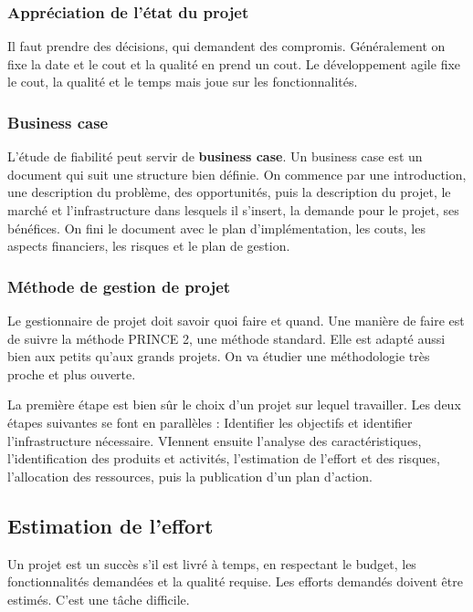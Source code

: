 \subsubsection{Appréciation de l'état du projet}
Il faut prendre des décisions, qui demandent des compromis. Généralement on fixe la date et le cout et la qualité en prend un cout. Le développement agile fixe le cout, la qualité et le temps mais joue sur les fonctionnalités.



\subsubsection{Business case}
L’étude de fiabilité peut servir de \textbf{business case}.
Un business case est un document qui suit une structure bien définie. On commence par une introduction, une description du problème, des opportunités, puis la description du projet, le marché et l’infrastructure dans lesquels il s’insert, la demande pour le projet, ses bénéfices.
On fini le document avec le plan d’implémentation, les couts, les aspects financiers, les risques et le plan de gestion.



\subsubsection{Méthode de gestion de projet}
Le gestionnaire de projet doit savoir quoi faire et quand.
Une manière de faire est de suivre la méthode PRINCE 2, une méthode standard. Elle est adapté aussi bien aux petits qu’aux grands projets.
On va étudier une méthodologie très proche et plus ouverte.

La première étape est bien sûr le choix d’un projet sur lequel travailler. Les deux étapes suivantes se font en parallèles : Identifier les objectifs et identifier l’infrastructure nécessaire. VIennent ensuite l’analyse des caractéristiques, l’identification des produits et activités, l’estimation de l’effort et des risques, l’allocation des ressources, puis la publication d’un plan d’action.



\subsection{Estimation de l’effort}
Un projet est un succès s’il est livré à temps, en respectant le budget, les fonctionnalités demandées et la qualité requise.
Les efforts demandés doivent être estimés. C’est une tâche difficile.

